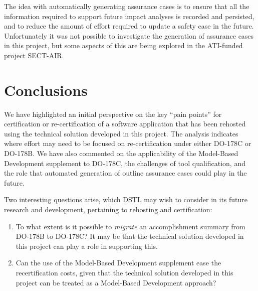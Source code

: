 \documentclass{llncs}
\begin{document}
The idea with automatically generating assurance cases is to ensure that all the information required to support future impact analyses is recorded and persisted, and to reduce the amount of effort required to update a safety case in the future. Unfortunately it was not possible to investigate the generation of assurance cases in this project, but some aspects of this are being explored in the ATI-funded project SECT-AIR.

\section{Conclusions}
We have highlighted an initial perspective on the key ``pain points'' for certification or re-certification of a software application that has been rehosted using the technical solution developed in this project. The analysis indicates where effort may need to be focused on re-certification under either DO-178C or DO-178B. We have also commented on the applicability of the Model-Based Development supplement to DO-178C, the challenges of tool qualification, and the role that automated generation of outline assurance cases could play in the future.

Two interesting questions arise, which DSTL may wish to consider in its future research and development, pertaining to rehosting and certification:
\begin{enumerate}
\item To what extent is it possible to \textit{migrate} an accomplishment summary from DO-178B to DO-178C? It may be that the technical solution developed in this project can play a role in supporting this.

\item Can the use of the Model-Based Development supplement ease the recertification costs, given that the technical solution developed in this project can be treated as a Model-Based Development approach?
\end{enumerate}



\renewcommand{\baselinestretch}{1.0}
\end{document}
